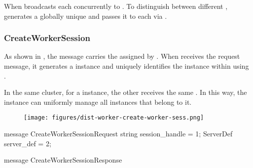 \begin{content}
When  broadcasts each  concurrently to . To distinguish between different ,  generates a globally unique  and passes it to each  via .

\begin{enum}
\end{enum}


\subsubsection{CreateWorkerSession}
As shown in , the  message carries the  assigned by . When  receives the request message, it generates a  instance and uniquely identifies the instance within  using .

In the same cluster, for a  instance, the other  receives the same . In this way, the  instance can uniformly manage all  instances that belong to it.

\begin{figure}[H]
  \centering
  \texttt{[image: figures/dist-worker-create-worker-sess.png]}
  \caption{}
  \label{fig:dist-worker-create-worker-sess}
\end{figure}

\begin{leftbar}
\begin{c++}
message CreateWorkerSessionRequest {
  string session_handle = 1;
  ServerDef server_def = 2;
}

message CreateWorkerSessionResponse {
}
\end{c++}
\end{leftbar}



\end{content}
